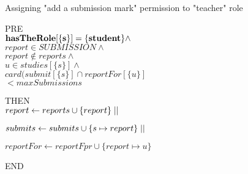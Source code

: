  \begin{algorithm}                      %
 	\caption{Assigning "add a submission mark" permission to "teacher" role}          %
 	\label{alg1}                          
 	
 	
 	PRE \\
 	
 	\quad ${\bf hasTheRole[\{s\}] = \{student\}} \wedge$\\
 	
 	\quad $report \in SUBMISSION \wedge$ \\
 	
 	\quad $report \notin reports \wedge$ \\
 	
 	\quad $u \in studies [\{s\}] \wedge$ \\
 	
 	\quad $card(submit[\{s\}] \cap reportFor[\{u\}]$ \\
 	
 	\quad $< maxSubmissions$
 	
 	
 	
 	THEN \\ 
 	
 	\quad $report \gets reports \cup \{report\} \mid\mid \\$
 	
 	\quad $submits \gets submits \cup \{s \mapsto report\} \mid\mid \\$
 	
 	\quad $reportFor \gets reportFpr \cup \{report \mapsto u\}$
 	
 	
 	END
 \end{algorithm} 
